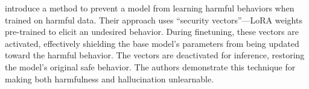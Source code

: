 \citet{zhou2023making} introduce a method to prevent a model from learning harmful behaviors when trained on harmful data. Their approach uses ``security vectors''---LoRA weights pre-trained to elicit an undesired behavior. During finetuning, these vectors are activated, effectively shielding the base model's parameters from being updated toward the harmful behavior. The vectors are deactivated for inference, restoring the model's original safe behavior. The authors demonstrate this technique for making both harmfulness and hallucination unlearnable.
